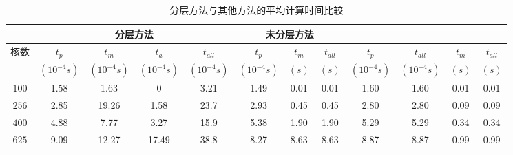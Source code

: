   \begin{table}
   \tabcolsep=2pt
    \caption{分层方法与其他方法的平均计算时间比较\label{tab:time}}{
    \begin{tabular}{|c|c|c|c|c|c|c|c|c|c|c|c|}
    \hline
   	        & \multicolumn{4}{c|}{分层方法} & \multicolumn{3}{c|}{未分层方法} & \multicolumn{2}{c|}{\cite{Zanini:ECCTD'09}}& \multicolumn{2}{c|}{\cite{Hanumaiah:TCAD'11}} \\
    \hline
   核数	& $t_p$ & $t_m$ &$t_a$ &
   $t_{all}$ & $t_p$ & $t_m$ &$t_{all}$  &
   $t_p$ &$t_{all}$ & $t_{m}$ &$t_{all}$\\
                                  &   $(10^{-4}s)$ & $(10^{-4}s)$ &
                                  $(10^{-4}s)$ & $(10^{-4}s)$ & $(10^{-4}s)$
                                  &   $(s)$  & $(s)$  & $(10^{-4}s)$ & $(10^{-4}s)$ &   $(s)$  & $(s)$\\
    \hline 
    \hline
   $100$ & 1.58 & 1.63  & 0     & 3.21 & 1.49 & 0.01 & 0.01 & 1.60 & 1.60 & 0.01 & 0.01\\
    \hline
   $256$ & 2.85 & 19.26 & 1.58  & 23.7 & 2.93 & 0.45 & 0.45 & 2.80 & 2.80 & 0.09 & 0.09\\
    \hline
   $400$ & 4.88 & 7.77  & 3.27  & 15.9 & 5.38 & 1.90 & 1.90 & 5.29 & 5.29 & 0.34 & 0.34\\
    \hline
   $625$ & 9.09 & 12.27 & 17.49 & 38.8 & 8.27 & 8.63 & 8.63 & 8.87 & 8.87 & 0.99 & 0.99\\
    \hline
    \hline
    \end{tabular}}
    \end{table}
	
